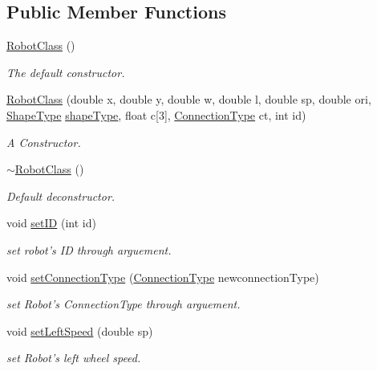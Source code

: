 \subsection*{Public Member Functions}
\begin{DoxyCompactItemize}
\item 
\hyperlink{classRobotClass_a7125604039c2a4b39e34e4354bd4ce19}{Robot\-Class} ()
\begin{DoxyCompactList}\small\item\em The default constructor. \end{DoxyCompactList}\item 
\hyperlink{classRobotClass_ab91816f1d752646bc82cc20f9710a107}{Robot\-Class} (double x, double y, double w, double l, double sp, double ori, \hyperlink{Shape_8h_a5a4538eeab397888d88a4eefcc5a1345}{Shape\-Type} \hyperlink{classShape_a18af04fdf7a9e121518f3c7278693c60}{shape\-Type}, float c\mbox{[}3\mbox{]}, \hyperlink{Sensor_8h_aa1f0e2efd52935fd01bfece0fbead81f}{Connection\-Type} ct, int id)
\begin{DoxyCompactList}\small\item\em A Constructor. \end{DoxyCompactList}\item 
\hyperlink{classRobotClass_a7d7725737f146f85ed7ceeae7f300e9e}{$\sim$\-Robot\-Class} ()
\begin{DoxyCompactList}\small\item\em Default deconstructor. \end{DoxyCompactList}\item 
void \hyperlink{classRobotClass_a583bdc55d13af3e8bd11f89d783455c0}{set\-I\-D} (int id)
\begin{DoxyCompactList}\small\item\em set robot's I\-D through arguement. \end{DoxyCompactList}\item 
void \hyperlink{classRobotClass_aaa965d250757f64738c66387791a6263}{set\-Connection\-Type} (\hyperlink{Sensor_8h_aa1f0e2efd52935fd01bfece0fbead81f}{Connection\-Type} newconnection\-Type)
\begin{DoxyCompactList}\small\item\em set Robot's Connection\-Type through arguement. \end{DoxyCompactList}\item 
void \hyperlink{classRobotClass_a7debd529fda1f510830328cf873cbc63}{set\-Left\-Speed} (double sp)
\begin{DoxyCompactList}\small\item\em set Robot's left wheel speed. \end{DoxyCompactList}\item 

\end{DoxyCompactItemize}
